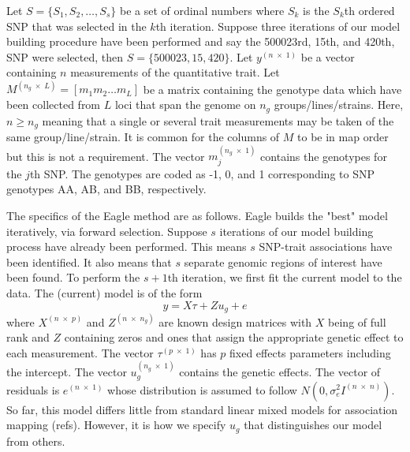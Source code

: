 \documentclass{article}
\begin{document}
Let $S = \{ S_1, S_2, \ldots, S_s\}$ be a set of ordinal numbers where $S_k$ is the $S_k$th ordered SNP that was 
selected in the $k$th iteration. Suppose three iterations of our model building procedure 
have been performed and say the 500023rd, 15th, and 420th, 
SNP were selected, then $S=\{500023, 15, 420\}$. 
Let $y^{(n \; \times \;1)}$ be a vector containing $n$ measurements of the quantitative trait. 
Let $M^{(n_g \; \times \; L)} = [m_1 m_2 \ldots m_L]$ be a matrix containing the genotype data which have been collected 
from $L$ loci that span the genome on $n_g$ groups/lines/strains.  Here, $n \geq n_g$ meaning that a single or several trait measurements 
may be taken of the same group/line/strain. 
 It is common for the columns of $M$ to be in map order but this is not a requirement. 
The vector $m_j^{(n_g \; \times \; 1)}$ contains the genotypes for the $j$th SNP. 
The genotypes are coded as -1, 0, and 1 corresponding to SNP genotypes AA, AB, and BB, respectively. 

The specifics of the Eagle method are as follows. 
Eagle builds the "best" model iteratively, via forward selection. 
Suppose $s$ iterations of our model building process have already been performed. This means $s$ SNP-trait 
associations have been identified.  It also means that $s$ separate genomic regions of interest have been found.  
To perform the $s+1$th  iteration, we first fit the current model to the data. 
The (current) model is of the form 
\begin{equation}
\label{eq1}
y = X \tau + Z u_g + e
\end{equation}
where 
$X^{(n \; \times \; p)}$ and $Z^{( n \; \times \; n_g)}$ are known design matrices with $X$ being of full rank and $Z$ 
containing zeros and ones that assign the appropriate genetic effect to each measurement. 
The vector 
$\tau^{(p \; \times \; 1)}$ has $p$ fixed effects parameters including the intercept. The vector 
$u_g^{(n_g \; \times \; 1)}$ contains the 
genetic effects. The vector of residuals is 
$e^{(n \; \times \;1)}$ whose distribution is assumed to follow $N(0, \sigma^2_e I^{(n \; \times \; n)})$. 
So far,  this model differs little from standard linear mixed models for association mapping (refs). 
However, 
it is how we specify $u_g$ that distinguishes our model from others. 
\end{document}
